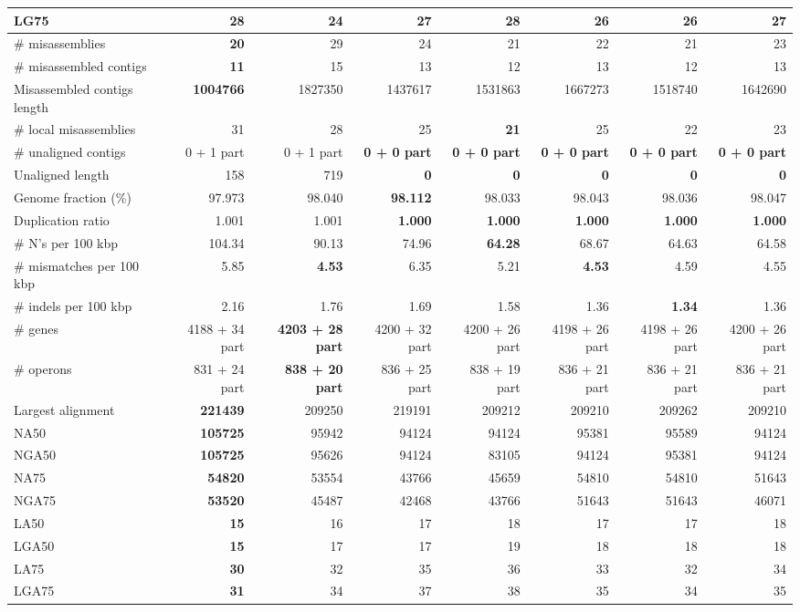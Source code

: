 \documentclass[12pt,a4paper]{article}
\begin{document}
\begin{table}[ht]
\begin{center}
\begin{tabular}{|l*{7}{|r}|}
LG75 & 28 & {\bf 24} & 27 & 28 & 26 & 26 & 27 \\ \hline
\# misassemblies & {\bf 20} & 29 & 24 & 21 & 22 & 21 & 23 \\ \hline
\# misassembled contigs & {\bf 11} & 15 & 13 & 12 & 13 & 12 & 13 \\ \hline
Misassembled contigs length & {\bf 1004766} & 1827350 & 1437617 & 1531863 & 1667273 & 1518740 & 1642690 \\ \hline
\# local misassemblies & 31 & 28 & 25 & {\bf 21} & 25 & 22 & 23 \\ \hline
\# unaligned contigs & 0 + 1 part & 0 + 1 part & {\bf 0 + 0 part} & {\bf 0 + 0 part} & {\bf 0 + 0 part} & {\bf 0 + 0 part} & {\bf 0 + 0 part} \\ \hline
Unaligned length & 158 & 719 & {\bf 0} & {\bf 0} & {\bf 0} & {\bf 0} & {\bf 0} \\ \hline
Genome fraction (\%) & 97.973 & 98.040 & {\bf 98.112} & 98.033 & 98.043 & 98.036 & 98.047 \\ \hline
Duplication ratio & 1.001 & 1.001 & {\bf 1.000} & {\bf 1.000} & {\bf 1.000} & {\bf 1.000} & {\bf 1.000} \\ \hline
\# N's per 100 kbp & 104.34 & 90.13 & 74.96 & {\bf 64.28} & 68.67 & 64.63 & 64.58 \\ \hline
\# mismatches per 100 kbp & 5.85 & {\bf 4.53} & 6.35 & 5.21 & {\bf 4.53} & 4.59 & 4.55 \\ \hline
\# indels per 100 kbp & 2.16 & 1.76 & 1.69 & 1.58 & 1.36 & {\bf 1.34} & 1.36 \\ \hline
\# genes & 4188 + 34 part & {\bf 4203 + 28 part} & 4200 + 32 part & 4200 + 26 part & 4198 + 26 part & 4198 + 26 part & 4200 + 26 part \\ \hline
\# operons & 831 + 24 part & {\bf 838 + 20 part} & 836 + 25 part & 838 + 19 part & 836 + 21 part & 836 + 21 part & 836 + 21 part \\ \hline
Largest alignment & {\bf 221439} & 209250 & 219191 & 209212 & 209210 & 209262 & 209210 \\ \hline
NA50 & {\bf 105725} & 95942 & 94124 & 94124 & 95381 & 95589 & 94124 \\ \hline
NGA50 & {\bf 105725} & 95626 & 94124 & 83105 & 94124 & 95381 & 94124 \\ \hline
NA75 & {\bf 54820} & 53554 & 43766 & 45659 & 54810 & 54810 & 51643 \\ \hline
NGA75 & {\bf 53520} & 45487 & 42468 & 43766 & 51643 & 51643 & 46071 \\ \hline
LA50 & {\bf 15} & 16 & 17 & 18 & 17 & 17 & 18 \\ \hline
LGA50 & {\bf 15} & 17 & 17 & 19 & 18 & 18 & 18 \\ \hline
LA75 & {\bf 30} & 32 & 35 & 36 & 33 & 32 & 34 \\ \hline
LGA75 & {\bf 31} & 34 & 37 & 38 & 35 & 34 & 35 \\ \hline
\end{tabular}
\end{center}
\end{table}
\end{document}
